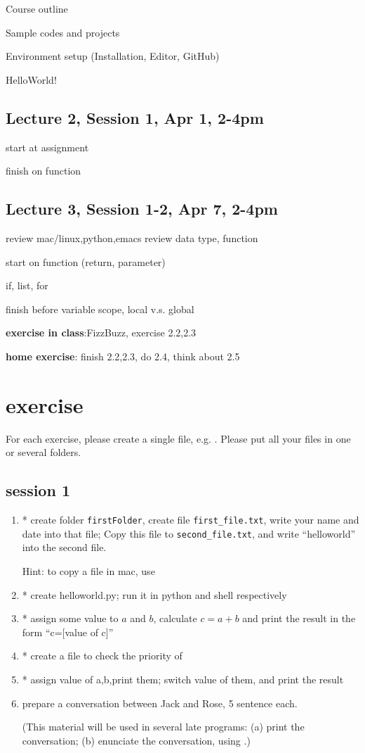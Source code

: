 \documentclass[aps,prb,12pt,tightenlines,%
notitlepage,longbibliography]{revtex4-1}
\begin{document}
Course outline

Sample codes and projects

Environment setup (Installation, Editor, GitHub)

HelloWorld!

\subsection{Lecture 2, Session 1, Apr 1, 2-4pm}
start at assignment

finish on function

\subsection{Lecture 3, Session 1-2, Apr 7, 2-4pm}

review mac/linux,python,emacs
review data type, function

start on function (return, parameter)

if, list, for

finish before variable scope, local v.s. global

\textbf{exercise in class}:FizzBuzz, exercise 2.2,2.3

\textbf{home exercise}: finish 2.2,2.3, do 2.4, think about 2.5


\section{exercise}
For each exercise, please create a single  file, e.g. . Please put
all your files in one or several folders.
\subsection{session 1}
\begin{enumerate}
  \item *
    create folder \texttt{firstFolder}, create file
    \texttt{first\_file.txt}, write your name and date into that file;
    Copy this file to \texttt{second\_file.txt}, and write
    ``helloworld'' into the second file.

    Hint: to copy a file in mac, use 
  \item *
    create helloworld.py; run it in python and shell respectively
  \item *
    assign some value to $a$ and $b$, calculate $c=a+b$ and print the
    result in the form ``c=[value of c]''
  \item *
    create a file to check the priority of \code{+-*/=}
  \item *
    assign value of a,b,print them; switch value of them, and print
    the result

  \item
    prepare a conversation between Jack and Rose, 5 sentence each.
    
    (This material will be used in several late programs: (a) print
    the conversation; (b) enunciate the conversation, using .)
\end{enumerate}
\end{document}
